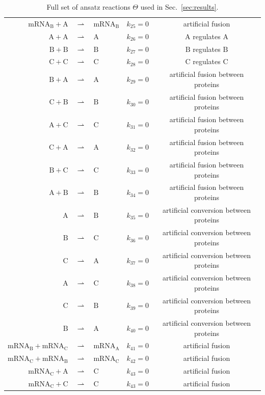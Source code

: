 \documentclass[oneside, abstracton, titlepage]{scrartcl}
\begin{document}
\begin{table}[h]
{\begin{tabular}{rclcc}
				$\mathrm{mRNA}_\mathrm{B} + \mathrm{A}$ &$\rightharpoonup$& $\mathrm{mRNA}_\mathrm{B}$ & $k_{25} = 0$ & artificial fusion\\
				$\mathrm{A} + \mathrm{A}$ &$\rightharpoonup$& $\mathrm{A}$ & $k_{26} = 0$ & $\mathrm{A}$ regulates $\mathrm{A}$\\
				$\mathrm{B} + \mathrm{B}$ &$\rightharpoonup$& $\mathrm{B}$ & $k_{27} = 0$ & $\mathrm{B}$ regulates $\mathrm{B}$\\
				$\mathrm{C} + \mathrm{C}$ &$\rightharpoonup$& $\mathrm{C}$ & $k_{28} = 0$ & $\mathrm{C}$ regulates $\mathrm{C}$\\
				$\mathrm{B} + \mathrm{A}$ &$\rightharpoonup$& $\mathrm{A}$ & $k_{29} = 0$ & artificial fusion between proteins\\
				$\mathrm{C} + \mathrm{B}$ &$\rightharpoonup$& $\mathrm{B}$ & $k_{30} = 0$ & artificial fusion between proteins\\
				$\mathrm{A} + \mathrm{C}$ &$\rightharpoonup$& $\mathrm{C}$ & $k_{31} = 0$ & artificial fusion between proteins\\
				$\mathrm{C} + \mathrm{A}$ &$\rightharpoonup$& $\mathrm{A}$ & $k_{32} = 0$ & artificial fusion between proteins\\
				$\mathrm{B} + \mathrm{C}$ &$\rightharpoonup$& $\mathrm{C}$ & $k_{33} = 0$ & artificial fusion between proteins\\
				$\mathrm{A} + \mathrm{B}$ &$\rightharpoonup$& $\mathrm{B}$ & $k_{34} = 0$ & artificial fusion between proteins\\
				$\mathrm{A}$ &$\rightharpoonup$& $\mathrm{B}$ & $k_{35} = 0$ & artificial conversion between proteins\\
				$\mathrm{B}$ &$\rightharpoonup$& $\mathrm{C}$ & $k_{36} = 0$ & artificial conversion between proteins\\
				$\mathrm{C}$ &$\rightharpoonup$& $\mathrm{A}$ & $k_{37} = 0$ & artificial conversion between proteins\\
				$\mathrm{A}$ &$\rightharpoonup$& $\mathrm{C}$ & $k_{38} = 0$ & artificial conversion between proteins\\
				$\mathrm{C}$ &$\rightharpoonup$& $\mathrm{B}$ & $k_{39} = 0$ & artificial conversion between proteins\\
				$\mathrm{B}$ &$\rightharpoonup$& $\mathrm{A}$ & $k_{40} = 0$ & artificial conversion between proteins\\
				$\mathrm{mRNA}_\mathrm{B} + \mathrm{mRNA}_\mathrm{C}$ &$\rightharpoonup$& $\mathrm{mRNA}_\mathrm{A}$ & $k_{41} = 0$ & artificial fusion\\
				$\mathrm{mRNA}_\mathrm{C} + \mathrm{mRNA}_\mathrm{B}$ &$\rightharpoonup$& $\mathrm{mRNA}_\mathrm{C}$ & $k_{42} = 0$ & artificial fusion\\
				$\mathrm{mRNA}_\mathrm{C} + \mathrm{A}$ &$\rightharpoonup$& $\mathrm{C}$ & $k_{43} = 0$ & artificial fusion\\
				$\mathrm{mRNA}_\mathrm{C} + \mathrm{C}$ &$\rightharpoonup$& $\mathrm{C}$ & $k_{43} = 0$ & artificial fusion
			\end{tabular}
		}
		\caption{Full set of ansatz reactions $\Theta$ used in Sec.~\ref{sec:results}.}
		\label{tab:reaction-library}
	\end{table}
\end{document}
